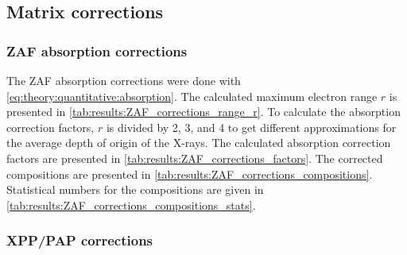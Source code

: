 \subsection{Matrix corrections}
\label{results:matrix_corrections}



\subsubsection{ZAF absorption corrections}
\label{results:matrix_corrections:ZAF}

The ZAF absorption corrections were done with \cref{eq:theory:quantitative:absorption}. %
The calculated maximum electron range $r$ is presented in \cref{tab:results:ZAF_corrections_range_r}.
To calculate the absorption correction factors, $r$ is divided by 2, 3, and 4 to get different approximations for the average depth of origin of the X-rays.
The calculated absorption correction factors are presented in \cref{tab:results:ZAF_corrections_factors}.
The corrected compositions are presented in \cref{tab:results:ZAF_corrections_compositions}.
Statistical numbers for the compositions are given in \cref{tab:results:ZAF_corrections_compositions_stats}.















\subsubsection{XPP/PAP corrections}
\label{results:matrix_corrections:XPP}

